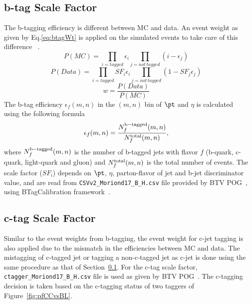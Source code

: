 \subsection{b-tag Scale Factor}
\label{s:bTagSF}
The b-tagging efficiency is different between MC and data.
An event weight as given by Eq.\ref{eq:btagWt} is applied on the simulated events to 
take care of this difference ~\cite{BTagSFMethods}. 
\begin{equation}
P(MC) = \prod_{i = tagged} \epsilon_i \prod_{j = not \, tagged}(i -\epsilon_j)
\end{equation}
\begin{equation}
P(Data) = \prod_{i=tagged} SF_{i}\epsilon_i \prod_{j = not \, tagged} (1-SF_j\epsilon_j)
\end{equation}
\begin{equation}
w = \frac{P(Data)}{P(MC)}
\label{eq:btagWt}
\end{equation}
 The b-tag efficiency $\epsilon_f(m,n)$ in the $(m,n)$ bin of $\pt$ and $\eta$ is calculated 
 using the following formula                                                               
 \begin{equation}                                                                          
  \epsilon_f(m,n)=\frac{N^{\rm b-tagged}_f(m,n)}{N^{\rm total}_f(m,n)},                   
 \label{eq:btag_eff}                                                                       
 \end{equation}                                                                            
 where $N^{\rm b-tagged}_f(m,n)$ is the number of b-tagged jets with flavor $f$ (b-quark, c-quark,
 light-quark and gluon) and $N^{\rm total}_f(m,n)$ is the total number of events. The scale factor ($SF_i$) 
 depends on $\pt$, $\eta$, parton-flavor of jet and b-jet discriminator value,
 and are read from \verb|CSVv2_Moriond17_B_H.csv| file provided by BTV POG~\cite{BTagReco},
 using BTagCalibration framework~\cite{BTagCalib}.                                         
\subsection{c-tag Scale Factor}
\label{s:cTagSF}

Similar to the event weights from b-tagging, the event weight for c-jet tagging is also applied due
to the mismatch in the
efficiencies between MC and data.
The mistagging of c-tagged jet or tagging a non-c-tagged jet as c-jet is done using the same
procedure as that of Section~\ref{s:bTagSF}.
For the c-tag scale factor, \verb|ctagger_Moriond17_B_H.csv| file is used as given by BTV
POG~\cite{BTagReco}. 
The c-tagging decision is taken based on the c-tagging status of two taggers of Figure~\ref{fig:pfCCvsBL}.
